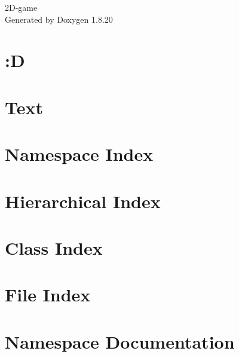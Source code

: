 \let\mypdfximage\pdfximage\def\pdfximage{\immediate\mypdfximage}\documentclass[twoside]{book}
\newcommand{\+}{\discretionary{\mbox{\scriptsize$\hookleftarrow$}}{}{}}
\newcommand{\clearemptydoublepage}{%
  \newpage{\pagestyle{empty}\cleardoublepage}%
}
\begin{document}
\hypersetup{pageanchor=false,
             bookmarksnumbered=true,
             pdfencoding=unicode
            }
\begin{titlepage}
\vspace*{7cm}
\begin{center}%
{\Large 2D-\/game }\\
\vspace*{1cm}
{\large Generated by Doxygen 1.8.20}\\
\end{center}
\end{titlepage}
\clearemptydoublepage
{}
\tableofcontents
\clearemptydoublepage
{}
\hypersetup{pageanchor=true}

\chapter{\+:D}
\label{md__c___users_kosmx__documents__git_hub_2d-game__r_e_a_d_m_e}

\chapter{Text}
\label{md__c___users_kosmx__documents__git_hub_2d-game__text}

\chapter{Namespace Index}

\chapter{Hierarchical Index}

\chapter{Class Index}

\chapter{File Index}

\chapter{Namespace Documentation}





\end{document}
